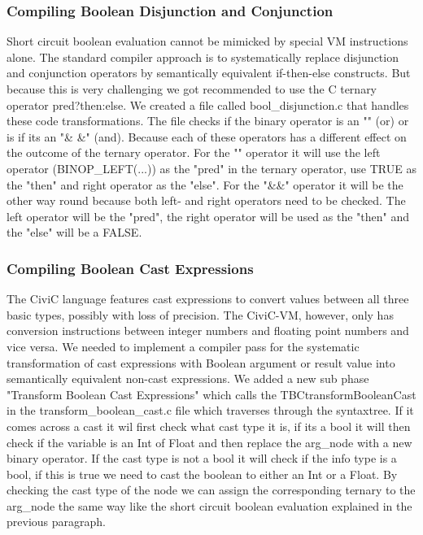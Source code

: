\documentclass[hidelinks]{uva-inf-article}
\begin{document}
\subsubsection{Compiling Boolean Disjunction and Conjunction}
Short circuit boolean evaluation cannot be mimicked by special VM instructions alone. The standard 
compiler approach is to systematically replace disjunction and conjunction operators by semantically 
equivalent if-then-else constructs. But because this is very challenging we got recommended to use the
C ternary operator pred?then:else. We created a file called bool\_disjunction.c that handles these 
code transformations. The file checks if the binary operator is an "\textbar \textbar" (or) or is if its an "\& \&" (and).
Because each of these operators has a different effect on the outcome of the ternary operator. For 
the "\textbar \textbar" operator it will use the left operator (BINOP\_LEFT(...)) as the "pred" in the ternary operator,
use TRUE as the "then" and right operator as the "else". For the "\&\&" operator it will be the other way 
round because both left- and right operators need to be checked. The left operator will be the "pred",
the right operator will be used as the "then" and the "else" will be a FALSE.

\subsubsection{Compiling Boolean Cast Expressions}
The CiviC language features cast expressions to convert values between all three basic types, possibly 
with loss of precision. The CiviC-VM, however, only has conversion instructions between integer numbers 
and floating point numbers and vice versa. We needed to implement a compiler pass for the systematic 
transformation of cast expressions with Boolean argument or result value into semantically equivalent 
non-cast expressions. We added a new sub phase "Transform Boolean Cast Expressions" which calls the 
TBCtransformBooleanCast in the transform\_boolean\_cast.c file which traverses through the syntaxtree.
If it comes across a cast it wil first check what cast type it is, if its a bool it will then check if the
variable is an Int of Float and then replace the arg\_node with a new binary operator. If the cast type
is not a bool it will check if the info type is a bool, if this is true we need to cast the boolean to 
either an Int or a Float. By checking the cast type of the node we can assign the corresponding ternary
to the arg\_node the same way like the short circuit boolean evaluation explained in the previous paragraph.
\end{document}
